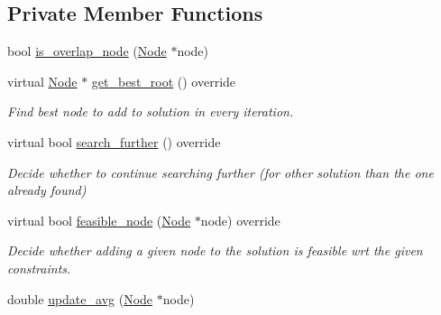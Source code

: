 \subsection*{Private Member Functions}
\begin{DoxyCompactItemize}
\item 
bool \hyperlink{classderegnet_1_1AvgSuboptimalStartHeuristic_abc4fa54576da31f3037f2c1aa2cd9140}{is\+\_\+overlap\+\_\+node} (\hyperlink{namespacederegnet_a744bad34f2de9856d36715a445f027f3}{Node} $\ast$node)
\item 
virtual \hyperlink{namespacederegnet_a744bad34f2de9856d36715a445f027f3}{Node} $\ast$ \hyperlink{classderegnet_1_1AvgSuboptimalStartHeuristic_a732194c0c56e6f28839114e3ab119109}{get\+\_\+best\+\_\+root} () override
\begin{DoxyCompactList}\small\item\em Find best node to add to solution in every iteration. \end{DoxyCompactList}\item 
virtual bool \hyperlink{classderegnet_1_1AvgSuboptimalStartHeuristic_a668a9db07c0d29c9b3618487f25fe5f4}{search\+\_\+further} () override
\begin{DoxyCompactList}\small\item\em Decide whether to continue searching further (for other solution than the one already found) \end{DoxyCompactList}\item 
virtual bool \hyperlink{classderegnet_1_1AvgSuboptimalStartHeuristic_aca3dd2ae41b88a0bd925b297d490e2cb}{feasible\+\_\+node} (\hyperlink{namespacederegnet_a744bad34f2de9856d36715a445f027f3}{Node} $\ast$node) override
\begin{DoxyCompactList}\small\item\em Decide whether adding a given node to the solution is feasible wrt the given constraints. \end{DoxyCompactList}\item 
double \hyperlink{classderegnet_1_1AvgSuboptimalStartHeuristic_a29659ab4864fddd2c226da7e1ada22ef}{update\+\_\+avg} (\hyperlink{namespacederegnet_a744bad34f2de9856d36715a445f027f3}{Node} $\ast$node)
\end{DoxyCompactItemize}
